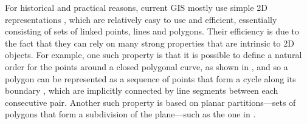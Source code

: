 For historical and practical reasons, current GIS mostly use simple 2D representations \citep{ESRITopology,SimpleFeatures1}, which are relatively easy to use and efficient, essentially consisting of sets of linked points, lines and polygons.
Their efficiency is due to the fact that they can rely on many strong properties that are intrinsic to 2D objects.
For example, one such property is that it is possible to define a natural order for the points around a closed polygonal curve, as shown in ,
and so a polygon can be represented as a sequence of points that form a cycle along its boundary \citep{Jordan87}, which are implicitly connected by line segments between each consecutive pair.
Another such property is based on planar partitions---sets of polygons that form a subdivision of the plane---such as the one in .
